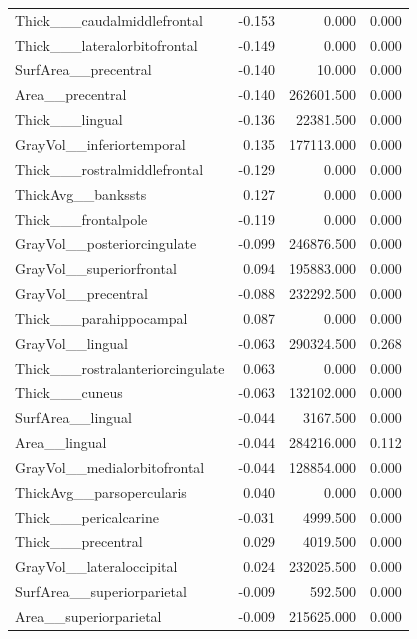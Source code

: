 \documentclass{article}
\begin{document}
\begin{longtable}{lrrr}
	Thick\_\_\_caudalmiddlefrontal & -0.153 & 0.000 & 0.000 \\
	Thick\_\_\_lateralorbitofrontal & -0.149 & 0.000 & 0.000 \\
	SurfArea\_\_precentral & -0.140 & 10.000 & 0.000 \\
	Area\_\_precentral & -0.140 & 262601.500 & 0.000 \\
	Thick\_\_\_lingual & -0.136 & 22381.500 & 0.000 \\
	GrayVol\_\_inferiortemporal & 0.135 & 177113.000 & 0.000 \\
	Thick\_\_\_rostralmiddlefrontal & -0.129 & 0.000 & 0.000 \\
	ThickAvg\_\_bankssts & 0.127 & 0.000 & 0.000 \\
	Thick\_\_\_frontalpole & -0.119 & 0.000 & 0.000 \\
	GrayVol\_\_posteriorcingulate & -0.099 & 246876.500 & 0.000 \\
	GrayVol\_\_superiorfrontal & 0.094 & 195883.000 & 0.000 \\
	GrayVol\_\_precentral & -0.088 & 232292.500 & 0.000 \\
	Thick\_\_\_parahippocampal & 0.087 & 0.000 & 0.000 \\
	GrayVol\_\_lingual & -0.063 & 290324.500 & 0.268 \\
	Thick\_\_\_rostralanteriorcingulate & 0.063 & 0.000 & 0.000 \\
	Thick\_\_\_cuneus & -0.063 & 132102.000 & 0.000 \\
	SurfArea\_\_lingual & -0.044 & 3167.500 & 0.000 \\
	Area\_\_lingual & -0.044 & 284216.000 & 0.112 \\
	GrayVol\_\_medialorbitofrontal & -0.044 & 128854.000 & 0.000 \\
	ThickAvg\_\_parsopercularis & 0.040 & 0.000 & 0.000 \\
	Thick\_\_\_pericalcarine & -0.031 & 4999.500 & 0.000 \\
	Thick\_\_\_precentral & 0.029 & 4019.500 & 0.000 \\
	GrayVol\_\_lateraloccipital & 0.024 & 232025.500 & 0.000 \\
	SurfArea\_\_superiorparietal & -0.009 & 592.500 & 0.000 \\
	Area\_\_superiorparietal & -0.009 & 215625.000 & 0.000 \\
	\end{longtable}
\end{document}
